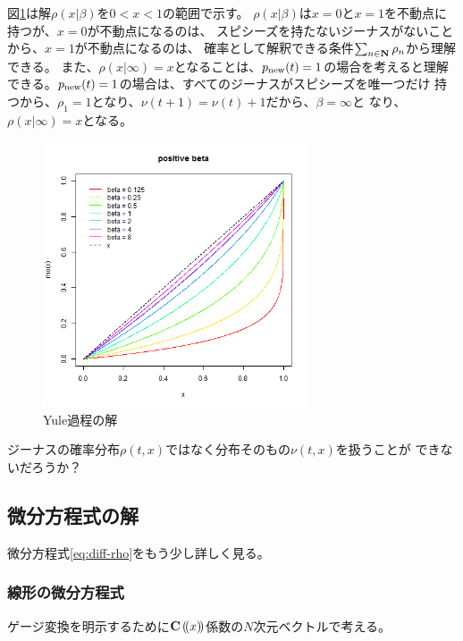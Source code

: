 \documentclass{jsarticle}
\newcommand{\new}{\op{new}}
\begin{document}
図\ref{fig:Yule過程の解}は解$\rho(x|\beta)$を$0<x<1$の範囲で示す。
$\rho(x|\beta)$は$x=0$と$x=1$を不動点に持つが、$x=0$が不動点になるのは、
スピシーズを持たないジーナスがないことから、$x=1$が不動点になるのは、
確率として解釈できる条件$\sum_{n\in\mathbf{N}}\rho_n$から理解できる。
また、$\rho(x|\infty)=x$となることは、$p_\new(t)=1$の場合を考えると理解
できる。$p_\new(t)=1$の場合は、すべてのジーナスがスピシーズを唯一つだけ
持つから、$\rho_1=1$となり、$\nu(t+1)=\nu(t)+1$だから、$\beta=\infty$と
なり、$\rho(x|\infty)=x$となる。

\begin{figure}[htbp] %
	\begin{center}
		\includegraphics[width=0.7\textwidth]{fig/yule-beta.png}
	\end{center}
	\caption{Yule過程の解}\label{fig:Yule過程の解}
\end{figure} %


\begin{todo}[今後の予定]\label{todo:今後の予定} %
	ジーナスの確率分布$\rho(t,x)$ではなく分布そのもの$\nu(t,x)$を扱うことが
	できないだろうか？
	\EOP
\end{todo} %
\subsection{微分方程式の解}\label{s2:微分方程式の解} %
微分方程式\eqref{eq:diff-rho}をもう少し詳しく見る。

\subsubsection{線形の微分方程式}\label{s3:線形の微分方程式} %
ゲージ変換を明示するために$\mathbf{C}\mathinner{(\!({x})\!)}$係数の$N$次元ベクトルで考える。
\end{document}
